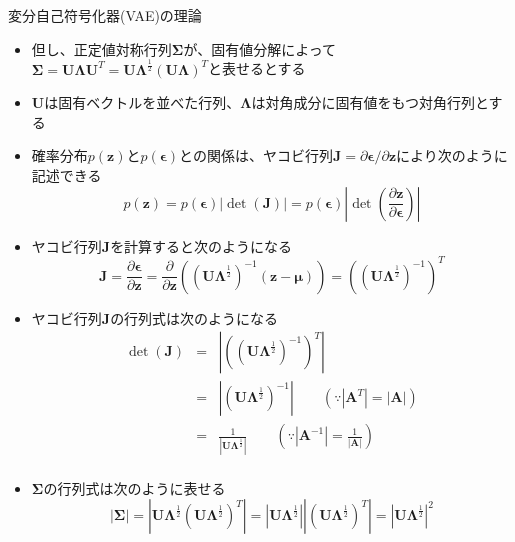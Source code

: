 \documentclass[dvipdfmx,notheorems,t]{beamer}
\begin{document}
\begin{frame}{変分自己符号化器(VAE)の理論}
\begin{itemize}
\begin{itemize}
		\item 但し、正定値対称行列$\bm{\Sigma}$が、固有値分解によって$\bm{\Sigma} = \bm{U} \bm{\Lambda} \bm{U}^T = \bm{U} \bm{\Lambda}^\frac{1}{2} \left( \bm{U} \bm{\Lambda} \right)^T$と表せるとする
		\item $\bm{U}$は固有ベクトルを並べた行列、$\bm{\Lambda}$は対角成分に固有値をもつ対角行列とする
		\newline
		
		\item 確率分布$p(\bm{z})$と$p(\bm{\epsilon})$との関係は、ヤコビ行列$\bm{J} = \partial \bm{\epsilon} / \partial \bm{z}$により次のように記述できる
		\begin{equation}
			p(\bm{z}) = p(\bm{\epsilon}) | \det \left( \bm{J} \right) | = p(\bm{\epsilon}) \left| \det \left( \frac{\partial \bm{z}}{\partial \bm{\epsilon}} \right) \right|
		\end{equation}
		
		\item ヤコビ行列$\bm{J}$を計算すると次のようになる
		\begin{equation}
			\bm{J} = \frac{\partial \bm{\epsilon}}{\partial \bm{z}} = \frac{\partial}{\partial \bm{z}} \left( \left( \bm{U} \bm{\Lambda}^\frac{1}{2} \right)^{-1} \left( \bm{z} - \bm{\mu} \right) \right) = \left( \left( \bm{U} \bm{\Lambda}^\frac{1}{2} \right)^{-1} \right)^T
		\end{equation}
		
		\item ヤコビ行列$\bm{J}$の行列式は次のようになる
		\begin{eqnarray}
			\det \left( \bm{J} \right) &=& \left| \left( \left( \bm{U} \bm{\Lambda}^\frac{1}{2} \right)^{-1} \right)^T \right| \nonumber \\
			&=& \left| \left( \bm{U} \bm{\Lambda}^\frac{1}{2} \right)^{-1} \right| \qquad (\because |\bm{A}^T| = |\bm{A}|) \nonumber \\
			&=& \frac{1}{\left| \bm{U} \bm{\Lambda}^\frac{1}{2} \right|} \qquad \left( \because |\bm{A}^{-1}| = \frac{1}{|\bm{A}|} \right) \nonumber \\
		\end{eqnarray}
		
		\item $\bm{\Sigma}$の行列式は次のように表せる
		\begin{equation}
			| \bm{\Sigma} | = \left| \bm{U} \bm{\Lambda}^\frac{1}{2} \left( \bm{U} \bm{\Lambda}^\frac{1}{2} \right)^T \right| = \left| \bm{U} \bm{\Lambda}^\frac{1}{2} \right| \left| \left( \bm{U} \bm{\Lambda}^\frac{1}{2} \right)^T \right| = \left| \bm{U} \bm{\Lambda}^\frac{1}{2} \right|^2
		\end{equation}
		

\end{itemize}
\end{itemize}
\end{frame}
\end{document}
